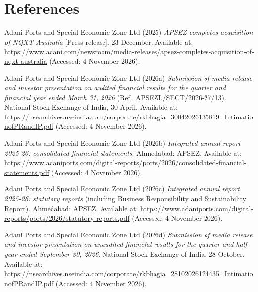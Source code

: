 \documentclass[12pt, a4paper]{article}
\begin{document}
\section*{References}
\label{sec:refs}
\begingroup
\small
\setlength{\parskip}{0pt}
\begin{list}{}{\setlength{\leftmargin}{8mm}\setlength{\itemindent}{-8mm}
               \setlength{\itemsep}{1.1ex}\setlength{\parsep}{0pt}
               \setlength{\topsep}{0pt}}
\raggedright

\item Adani Ports and Special Economic Zone Ltd (2025) \textit{APSEZ completes acquisition of NQXT Australia} [Press release]. 23 December. Available at: \url{https://www.adani.com/newsroom/media-releases/apsez-completes-acquisition-of-nqxt-australia} (Accessed: 4 November 2026).

\item Adani Ports and Special Economic Zone Ltd (2026a) \textit{Submission of media release and investor presentation on audited financial results for the quarter and financial year ended March 31, 2026} (Ref.\ APSEZL/SECT/2026-27/13). National Stock Exchange of India, 30 April. Available at: \url{https://nsearchives.nseindia.com/corporate/rkbhagia_30042026135819_IntimationofPRandIP.pdf} (Accessed: 4 November 2026).

\item Adani Ports and Special Economic Zone Ltd (2026b) \textit{Integrated annual report 2025-26: consolidated financial statements}. Ahmedabad: APSEZ. Available at: \url{https://www.adaniports.com/digital-reports/ports/2026/consolidated-financial-statements.pdf} (Accessed: 4 November 2026).

\item Adani Ports and Special Economic Zone Ltd (2026c) \textit{Integrated annual report 2025-26: statutory reports} (including Business Responsibility and Sustainability Report). Ahmedabad: APSEZ. Available at: \url{https://www.adaniports.com/digital-reports/ports/2026/statutory-reports.pdf} (Accessed: 4 November 2026).

\item Adani Ports and Special Economic Zone Ltd (2026d) \textit{Submission of media release and investor presentation on unaudited financial results for the quarter and half year ended September 30, 2026}. National Stock Exchange of India, 28 October. Available at: \url{https://nsearchives.nseindia.com/corporate/rkbhagia_28102026124435_IntimationofPRandIP.pdf} (Accessed: 4 November 2026).


\end{list}
\end{document}
